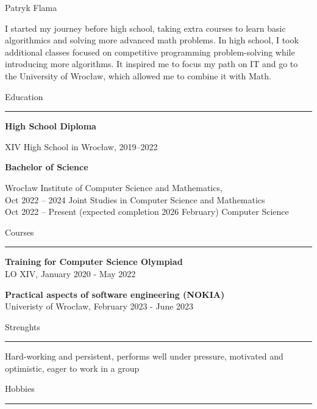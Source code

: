 \documentclass{letter}
\begin{document}
\hfill
\begin{minipage}[t]{0.60\textwidth}
\setlength{\baselineskip}{1.5\baselineskip}
\vspace{0.8cm}
{\huge Patryk Flama}

\vspace{0.3cm}

\begin{spacing}{1.125}
\small 
I started my journey before high school, taking extra courses to learn basic algorithmics and solving more advanced math problems. In high school, I took additional classes focused on competitive programming problem-solving while introducing more algorithms. It inspired me to focus my path on IT and go to the University of Wrocław, which allowed me to combine it with Math.
\end{spacing}

\vspace{0.3cm}

{\large Education}
\rule{\linewidth}{0.4pt}

{\large \textbf{High School Diploma}}

{\small XIV High School in Wrocław, 2019--2022}

{\large \textbf{Bachelor of Science}}

{\small Wrocław Institute of Computer Science and Mathematics, \\
Oct 2022 -- 2024 Joint Studies in Computer Science and Mathematics \\
Oct 2022 -- Present (expected completion 2026 February) Computer Science}

\vspace{0.3cm}

{\large Courses}
\rule{\linewidth}{0.4pt}

\textbf{Training for Computer Science Olympiad} \\
{\small  LO XIV, January 2020 - May 2022}

\textbf{Practical aspects of software engineering (NOKIA)} \\
{\small Univeristy of Wrocław, February 2023 - June 2023}

\vspace{0.3cm}

{\large Strenghts}
\rule{\linewidth}{0.4pt}
Hard-working and persistent, performs well under pressure, motivated and optimistic, eager to work in a group

\vspace{0.3cm}

{\large Hobbies}
\rule{\linewidth}{0.4pt}


\end{minipage}
\end{document}
